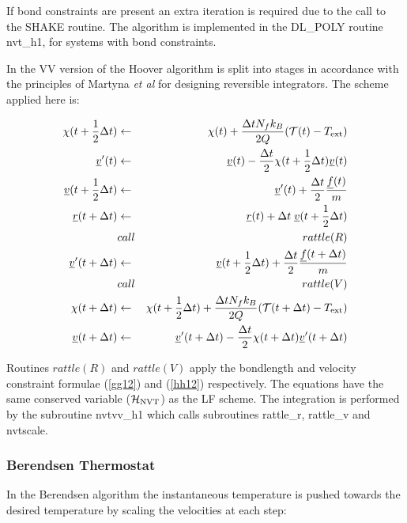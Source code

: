 If bond constraints are present an extra iteration is required due to
the call to the SHAKE routine. The algorithm is implemented in the
DL\_POLY routine {\sc nvt\_h1}, for systems with bond constraints.

In the VV version of \D{} the Hoover algorithm is split into stages in
accordance with the principles of Martyna {\em et al} \cite{martyna-96a}
for designing reversible integrators. 
The scheme applied here is:

\begin{eqnarray}
\chi(t+{1\over2}\Delta t) &\leftarrow& \chi(t) + {\Delta t N_fk_B  \over
2 Q} ( {\cal T}(t) - T_{\rm ext}) \nonumber\\
\mbox{$\underline{v}$}'(t)&\leftarrow& \mbox{$\underline{v}$}(t) -
 {\Delta t \over 2}\chi(t+{1\over 2}\Delta t)\mbox{$\underline{v}$}(t)\nonumber\\
\mbox{$\underline{v}$}(t + {1\over 2} \Delta t)&\leftarrow& \mbox{$\underline{v}$}'(t)
+ {\Delta t \over 2} {\mbox{$\underline{f}$}(t)\over m} \nonumber \\
\mbox{$\underline{r}$}(t+\Delta t) &\leftarrow& \mbox{$\underline{r}$}(t) + \Delta t \;
\mbox{$\underline{v}$}(t+{1\over 2}\Delta t)\nonumber \\
&call&rattle(R) \nonumber \\
\mbox{$\underline{v}$}'(t + \Delta t)&\leftarrow& \mbox{$\underline{v}$}(t + {1 \over 2}\Delta t) +
 {\Delta t \over 2} {\mbox{$\underline{f}$}(t + \Delta t)\over m} \nonumber \\
&call&rattle(V) \nonumber \\
\chi(t+\Delta t) &\leftarrow& \chi(t+{1\over 2}\Delta t) + {\Delta t
N_f k_B \over 2Q }( {{\cal T}(t+\Delta t) - T_{\rm ext}} ) \nonumber \\
\mbox{$\underline{v}$}(t + \Delta t)&\leftarrow& \mbox{$\underline{v}$}'(t + \Delta t) -
 {\Delta t \over 2}\chi(t+\Delta t)\mbox{$\underline{v}$}'(t+\Delta t)
\end{eqnarray}

Routines $rattle(R)$ and $rattle(V)$ apply the bondlength and velocity
constraint formulae (\ref{gg12}) and (\ref{hh12}) respectively.  The
equations have the same conserved variable (${\cal H}_{\rm NVT}$) as
the LF scheme. The integration is performed by the subroutine {\sc
nvtvv\_h1} which calls subroutines {\sc rattle\_r, rattle\_v} and {\sc
nvtscale}. 

\subsubsection{Berendsen Thermostat}
In the Berendsen algorithm the instantaneous temperature is pushed
towards the desired temperature by scaling the velocities at each
step:

